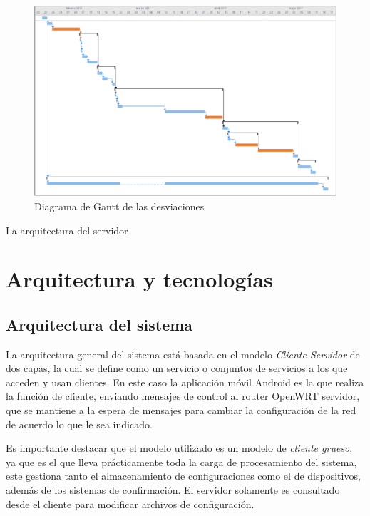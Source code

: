 \documentclass[12pt]{article}
\begin{document}
        \begin{figure}[h!]
            \centering
                \includegraphics[scale=0.7]{deviations_gantt.eps}
                \caption{Diagrama de Gantt de las desviaciones}
                \label{fig:deviations_gantt}
        \end{figure}

        La arquitectura del servidor 

\section{Arquitectura y tecnologías} \label{sec:arq}

    \subsection{Arquitectura del sistema}

        La arquitectura general del sistema está basada en el modelo \textit{Cliente-Servidor} de dos capas, la cual se define como un servicio o conjuntos de servicios a los que acceden y usan clientes. En este caso la aplicación móvil Android es la que realiza la función de cliente, enviando mensajes de control al router OpenWRT servidor, que se mantiene a la espera de mensajes para cambiar la configuración de la red de acuerdo lo que le sea indicado.

        Es importante destacar que el modelo utilizado es un modelo de \textit{cliente grueso}, ya que es el que lleva prácticamente toda la carga de procesamiento del sistema, este gestiona tanto el almacenamiento de configuraciones como el de dispositivos, además de los sistemas de confirmación. El servidor solamente es consultado desde el cliente para modificar archivos de configuración.
\end{document}
